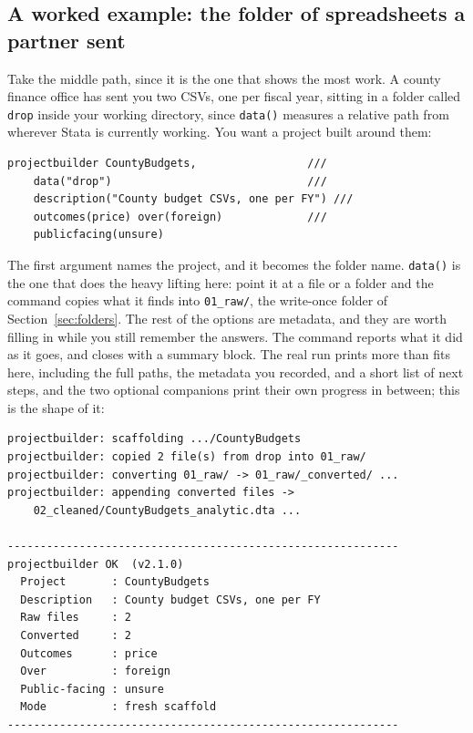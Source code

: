 \subsection{A worked example: the folder of spreadsheets a partner sent}\label{sec:ch02-pb-worked}
Take the middle path, since it is the one that shows the most work. A county finance office has sent you two CSVs, one per fiscal year, sitting in a folder called \texttt{drop} inside your working directory, since \texttt{data()} measures a relative path from wherever Stata is currently working. You want a project built around them:
\par
{\footnotesize
\begin{verbatim}
projectbuilder CountyBudgets,                 ///
    data("drop")                              ///
    description("County budget CSVs, one per FY") ///
    outcomes(price) over(foreign)             ///
    publicfacing(unsure)
\end{verbatim}
}
The first argument names the project, and it becomes the folder name. \texttt{data()} is the one that does the heavy lifting here: point it at a file or a folder and the command copies what it finds into \texttt{01\_raw/}, the write-once folder of Section~\ref{sec:folders}. The rest of the options are metadata, and they are worth filling in while you still remember the answers. The command reports what it did as it goes, and closes with a summary block. The real run prints more than fits here, including the full paths, the metadata you recorded, and a short list of next steps, and the two optional companions print their own progress in between; this is the shape of it:
\par
{\footnotesize
\begin{verbatim}
projectbuilder: scaffolding .../CountyBudgets
projectbuilder: copied 2 file(s) from drop into 01_raw/
projectbuilder: converting 01_raw/ -> 01_raw/_converted/ ...
projectbuilder: appending converted files ->
    02_cleaned/CountyBudgets_analytic.dta ...

------------------------------------------------------------
projectbuilder OK  (v2.1.0)
  Project       : CountyBudgets
  Description   : County budget CSVs, one per FY
  Raw files     : 2
  Converted     : 2
  Outcomes      : price
  Over          : foreign
  Public-facing : unsure
  Mode          : fresh scaffold
------------------------------------------------------------
\end{verbatim}
}
